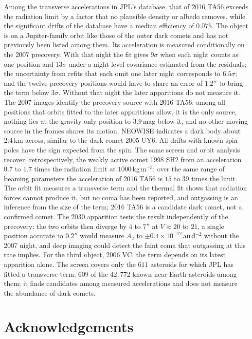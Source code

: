 \documentclass[3p,11pt]{elsarticle}
\begin{document}
Among the transverse accelerations in JPL's database, that of 2016 TA56 exceeds the
radiation limit by a factor that no plausible density or albedo removes, while the
significant drifts of the database have a median efficiency of $0.075$. The object is on a
Jupiter-family orbit like those of the outer dark comets and has not previously been
listed among them. Its acceleration is measured conditionally on the 2007 precovery. With
that night the fit gives $9\sigma$ when each night counts as one position and $13\sigma$
under a night-level covariance estimated from the residuals; the uncertainty from refits
that each omit one later night corresponds to $6.5\sigma$; and the twelve precovery
positions would have to share an error of $1.2''$ to bring the term below $3\sigma$.
Without that night the later apparitions do not measure it. The 2007 images identify the
precovery source with 2016 TA56: among all positions that orbits fitted to the later
apparitions allow, it is the only source, nothing lies at the gravity-only position to
$3.9$\,mag below it, and no other moving source in the frames shares its motion. NEOWISE
indicates a dark body about $2.4$\,km across, similar to the dark comet 2005 UY6. All
drifts with known spin poles have the sign expected from the spin. The same screen and
orbit analysis recover, retrospectively, the weakly active comet 1998 SH2 from an
acceleration $0.7$ to $1.7$ times the radiation limit at $1000$\,kg\,m$^{-3}$; over the
same range of beaming parameters the acceleration of 2016 TA56 is $15$ to $39$ times the
limit. The orbit fit measures a transverse term and the thermal fit shows that radiation
forces cannot produce it, but no coma has been reported, and outgassing is an inference
from the size of the term; 2016 TA56 is a candidate dark comet, not a confirmed comet. The
2030 apparition tests the result independently of the precovery: the two orbits then
diverge by $4$ to $7''$ at $V\approx20$ to $21$, a single position accurate to $0.2''$
would measure $A_2$ to $\pm0.4\times10^{-12}$\,au\,d$^{-2}$ without the 2007 night, and
deep imaging could detect the faint coma that outgassing at this rate implies. For the
third object, 2006 VC, the term depends on its latest apparition alone. The screen covers
only the $611$ asteroids for which JPL has fitted a transverse term, $609$ of the
$42{,}772$ known near-Earth asteroids among them; it finds candidates among measured
accelerations and does not measure the abundance of dark comets.

\section*{Acknowledgements}
\end{document}
